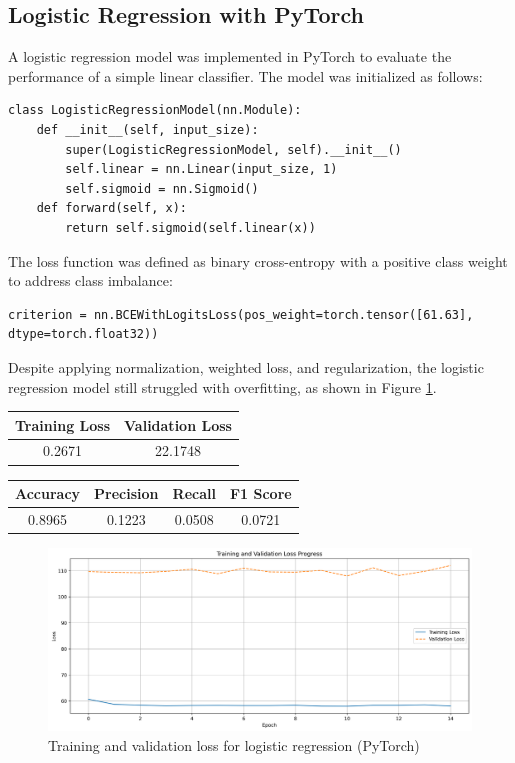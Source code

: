 \documentclass[conference,9pt]{IEEEtran}
\begin{document}
\subsection{Logistic Regression with PyTorch}
A logistic regression model was implemented in PyTorch to evaluate the performance of a simple linear classifier. The model was initialized as follows:
\begin{lstlisting}
class LogisticRegressionModel(nn.Module):
    def __init__(self, input_size):
        super(LogisticRegressionModel, self).__init__()
        self.linear = nn.Linear(input_size, 1)
        self.sigmoid = nn.Sigmoid()
    def forward(self, x):
        return self.sigmoid(self.linear(x))
\end{lstlisting}
The loss function was defined as binary cross-entropy with a positive class weight to address class imbalance:
\begin{lstlisting}
criterion = nn.BCEWithLogitsLoss(pos_weight=torch.tensor([61.63], dtype=torch.float32))
\end{lstlisting}
Despite applying normalization, weighted loss, and regularization, the logistic regression model still struggled with overfitting, as shown in Figure \ref{fig:logistic_torch}.
\begin{center}
    \begin{tabular}{c|c}
        Training Loss & Validation Loss \\ 
        \hline 
        0.2671 & 22.1748 \\
    \end{tabular}
\end{center}
\begin{center}
    \begin{tabular}{c|c|c|c}
        Accuracy & Precision & Recall & F1 Score \\ 
        \hline 
        0.8965 & 0.1223 &  0.0508 & 0.0721\\
    \end{tabular}
\end{center}
\begin{figure}[h]
    \centering
    \includegraphics[width=\columnwidth]{../training_validation_loss_Iteration6.png}
    \caption{Training and validation loss for logistic regression (PyTorch)}
    \label{fig:logistic_torch}
\end{figure}
\end{document}

